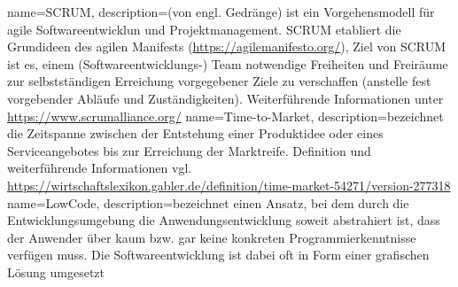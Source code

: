 {
    name=SCRUM,
    description={(von engl. \glqq{}Gedränge\grqq{}) ist ein Vorgehensmodell für agile Softwareentwicklun und Projektmanagement. SCRUM etabliert die Grundideen des agilen Manifests (\url{https://agilemanifesto.org/}), Ziel von SCRUM ist es, einem (Softwareentwicklungs-) Team notwendige Freiheiten und Freiräume zur selbstständigen Erreichung vorgegebener Ziele zu verschaffen (anstelle fest vorgebender Abläufe und Zuständigkeiten). Weiterführende Informationen unter \url{https://www.scrumalliance.org/}}
}
{
    name=Time-to-Market,
    description={bezeichnet die Zeitspanne zwischen der Entstehung einer Produktidee oder eines Serviceangebotes bis zur Erreichung der Marktreife. Definition und weiterführende Informationen vgl. \url{https://wirtschaftslexikon.gabler.de/definition/time-market-54271/version-277318}}
}
{
    name=LowCode,
    description={bezeichnet einen Ansatz, bei dem durch die Entwicklungsumgebung die Anwendungsentwicklung soweit abstrahiert ist, dass der Anwender über kaum bzw. gar keine konkreten Programmierkenntnisse verfügen muss. Die Softwareentwicklung ist dabei oft in Form einer grafischen Lösung umgesetzt}
}


\printglossary[type=\acronymtype,title=Abkürzungsverzeichnis]

\newpage

\printglossary[type=main,title=Fachbegriffe]
